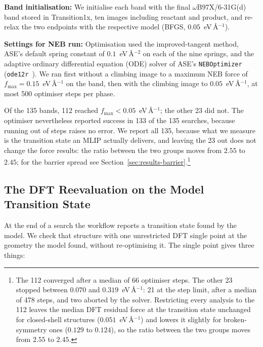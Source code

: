 \textbf{Band initialisation:} We initialise each band with the final \mbox{$\omega$B97X/6-31G(d)} band stored in
Transition1x, ten images including reactant and product, and re-relax the two
endpoints with the respective model (BFGS, $0.05$~eV\,\AA$^{-1}$).

\textbf{Settings for NEB run:} Optimisation used the improved-tangent method, ASE's default spring constant of
$0.1$~eV\,\AA$^{-2}$ on each of the nine springs, and the adaptive ordinary
differential equation (ODE) solver of ASE's \texttt{NEBOptimizer}
(\texttt{ode12r}~\cite{makri2019preconditioning}). We ran first without a
climbing image to a maximum NEB force of $f_\mathrm{max} = 0.15$~eV\,\AA$^{-1}$ on the band,
then with the climbing image to $0.05$~eV\,\AA$^{-1}$, at most 500 optimiser
steps per phase.



Of the 135 bands, 112 reached $f_\mathrm{max} < 0.05$~eV\,\AA$^{-1}$;
the other 23 did not. The optimiser nevertheless reported success in
133 of the 135 searches, because running out of steps raises no
error. We report all 135, because what we measure is the transition
state an MLIP actually delivers, and leaving the 23 out does not
change the force results: the ratio between the two groups moves from
$2.55$ to $2.45$; for the barrier spread see
Section~\ref{sec:results-barrier}.\footnote{The 112 converged after a
median of 66 optimiser steps. The other 23 stopped between $0.070$
and $0.319$~eV\,\AA$^{-1}$: 21 at the step limit, after a median of
478 steps, and two aborted by the solver. Restricting every analysis
to the 112 leaves the median DFT residual force at the transition state
unchanged for closed-shell structures ($0.051$~eV\,\AA$^{-1}$) and lowers it
slightly for broken-symmetry ones ($0.129$ to $0.124$), so the ratio between the
two groups moves from $2.55$ to $2.45$.}


\subsection{The DFT Reevaluation on the Model Transition State}
\label{sec:dft}

At the end of a search the workflow reports a transition state found
by the model. We check that structure with one unrestricted DFT
single point at the geometry the model found, without re-optimising
it. The single point gives three things:

